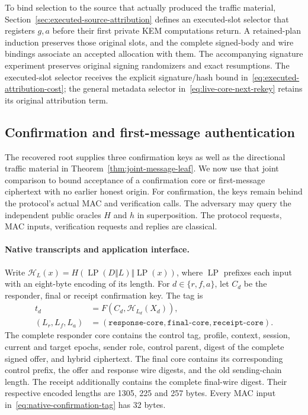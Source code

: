 \documentclass[pdflatex]{sn-jnl}
\theoremstyle{thmstyleone}
\theoremstyle{thmstylethree}
\theoremstyle{thmstyletwo}
\begin{document}
To bind selection to the source that actually produced the traffic material,
Section~\ref{sec:executed-source-attribution} defines an executed-slot
selector that registers $g,a$ before their first private KEM computations
return. A retained-plan induction preserves those original slots, and the
complete signed-body and wire bindings associate an accepted allocation
with them. The accompanying signature experiment preserves original signing
randomizers and exact resumptions. The executed-slot selector receives the explicit signature/hash
bound in~\eqref{eq:executed-attribution-cost}; the general metadata selector
in~\eqref{eq:live-core-next-rekey} retains its original attribution term.
\subsection{Confirmation and first-message authentication}
\label{sec:confirmation-traffic}

The recovered root supplies three confirmation keys as well as the
directional traffic material in Theorem~\ref{thm:joint-message-leaf}.
We now use that joint comparison to bound acceptance of a confirmation
core or first-message ciphertext with no earlier honest origin. For
confirmation, the keys remain behind the protocol's actual MAC and
verification calls.
The adversary may query the independent public oracles $H$ and $h$ in
superposition. The protocol requests, MAC inputs, verification requests
and replies are classical.

\paragraph{Native transcripts and application interface.}
Write $\mathcal H_L(x)=H(\operatorname{LP}(D\Vert L)
\Vert\operatorname{LP}(x))$, where $\operatorname{LP}$ prefixes each input
with an eight-byte encoding of its length. For $d\in\{r,f,a\}$, let $C_d$ be the responder,
final or receipt confirmation key. The tag is
\begin{equation}
\begin{aligned}
 t_d&=F(C_d,\mathcal H_{L_d}(X_d)),\\
 (L_r,L_f,L_a)&=(\texttt{response-core},\texttt{final-core},
                         \texttt{receipt-core}).
\end{aligned}
\label{eq:native-confirmation-tag}
\end{equation}
The complete responder core contains the control tag, profile, context,
session, current and target epochs, sender role, control parent, digest of
the complete signed offer, and hybrid ciphertext. The final core contains
its corresponding control prefix, the offer and response wire digests,
and the old sending-chain length. The receipt additionally contains the
complete final-wire digest. Their respective encoded lengths are 1305,
225 and 257 bytes. Every MAC input in~\eqref{eq:native-confirmation-tag}
has 32 bytes.
\end{document}
